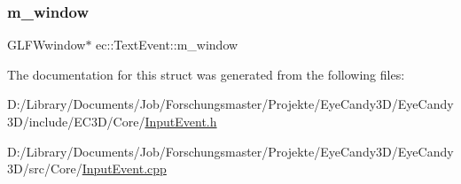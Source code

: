 \mbox{\label{structec_1_1_text_event_a7ab9619fd97483a705ef8e4ea6bd7f83}} 
\subsubsection{\texorpdfstring{m\+\_\+window}{m\_window}}
{\footnotesize\ttfamily G\+L\+F\+Wwindow$\ast$ ec\+::\+Text\+Event\+::m\+\_\+window}



The documentation for this struct was generated from the following files\+:\begin{DoxyCompactItemize}
\item 
D\+:/\+Library/\+Documents/\+Job/\+Forschungsmaster/\+Projekte/\+Eye\+Candy3\+D/\+Eye\+Candy3\+D/include/\+E\+C3\+D/\+Core/\mbox{\hyperlink{_input_event_8h}{Input\+Event.\+h}}\item 
D\+:/\+Library/\+Documents/\+Job/\+Forschungsmaster/\+Projekte/\+Eye\+Candy3\+D/\+Eye\+Candy3\+D/src/\+Core/\mbox{\hyperlink{_input_event_8cpp}{Input\+Event.\+cpp}}\end{DoxyCompactItemize}
